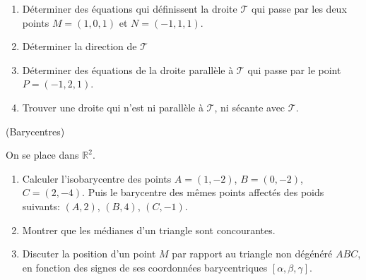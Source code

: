 \documentclass[a4paper,12pt,reqno]{amsart}
\begin{document}
\begin{exo}
\begin{enumerate}
    \begin{enumerate}
      \item Déterminer des équations qui définissent la droite $\mathcal{T}$ qui passe par les deux points $M=(1,0,1)$ et $N=(-1,1,1)$.
      \item Déterminer la direction de $\mathcal{T}$
      \item Déterminer des équations de la droite parallèle à $\mathcal{T}$ qui passe par le point $P=(-1,2,1)$.
      \item Trouver une droite qui n'est ni parallèle à $\mathcal{T}$, ni sécante avec $\mathcal{T}$.
    \end{enumerate}
  \end{enumerate}
\end{exo}

\begin{exo} (Barycentres)

On se place dans $\mathbb{R}^{2}$.

\begin{enumerate}
  \item Calculer l'isobarycentre des points $A=(1,-2)$, $B=(0,-2)$, $C=(2,-4)$. Puis le barycentre des mêmes points affectés des poids suivants: $(A,2)$, $(B,4)$, $(C,-1)$.

  \item Montrer que les médianes d'un triangle sont concourantes.

  \item Discuter la position d'un point $M$ par rapport au triangle non dégénéré $ABC$, en fonction des signes de ses coordonnées barycentriques $[\alpha, \beta, \gamma]$.

\end{enumerate}

\end{exo}
\end{document}
